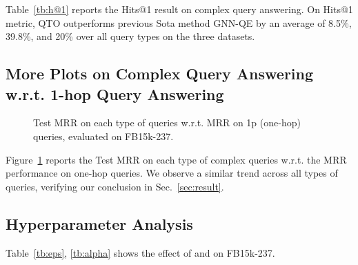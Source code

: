 Table~\ref{tb:h@1} reports the Hits@1 result on complex query answering.
On Hits@1 metric, QTO outperforms previous Sota method GNN-QE by an average of 8.5\%, 39.8\%, and 20\% over all query types on the three datasets.

\subsection{More Plots on Complex Query Answering w.r.t. 1-hop Query Answering}
\label{app:plot}

\begin{figure}[htbp]
    \centering
    \quad
    \quad
    \quad
    \caption{Test MRR on each type of queries w.r.t. MRR on 1p (one-hop) queries, evaluated on FB15k-237.}
    \label{fig:all-1p}
\end{figure}

Figure~\ref{fig:all-1p} reports the Test MRR on each type of complex queries w.r.t. the MRR performance on one-hop queries. We observe a similar trend across all types of queries, verifying our conclusion in Sec.~\ref{sec:result}.

\subsection{Hyperparameter Analysis}
\label{app:hyper}
Table~\ref{tb:eps}, \ref{tb:alpha} shows the effect of  and  on FB15k-237.

